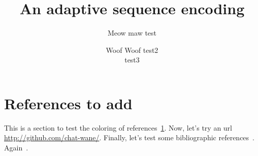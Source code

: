 \documentclass{class-for-drafts}
\title{An adaptive sequence encoding}
\author{Meow maw \aff test \and Woof Woof \aff test2 \\ test3}
\begin{document}
\maketitle

\section{References to add}
\label{sec:reference_test}

This is a section to test the coloring of
references~\ref{sec:reference_test}. Now, let's try an url
\url{http://github.com/chat-wane/}. Finally, let's test some bibliographic
references~\cite{nedelec2013lseq}. Again~\cite{nedelec2015spray,nedelec2016crate}.

\blinddocument



\end{document}

